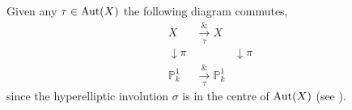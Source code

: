 Given any $\tau \in \operatorname{Aut}(X)$ the following diagram commutes,
    \[
    \begin{array}{ccc}
    X & \xrightarrow[\tau] & X \\
    \downarrow\pi & & \downarrow\pi \\
    \mathbb P^1_k & \xrightarrow[\tau] & \mathbb P_k^1
    \end{array}
    \]
since the hyperelliptic involution $\sigma$ is in the centre of $\operatorname{Aut}(X)$ (see \cite[Cor.\ 7.4.31]{liu}).

